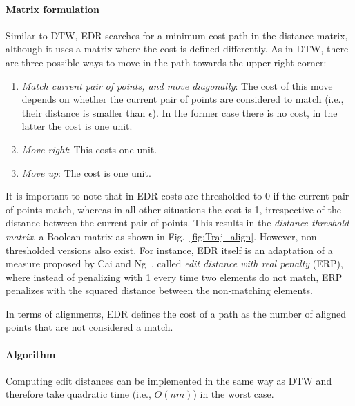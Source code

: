 \documentclass[10pt,letterpaper]{article}
\begin{document}
\paragraph{Matrix formulation}
Similar to DTW, EDR searches for a minimum cost path in the distance matrix, although it uses a matrix where the cost is defined differently. As in DTW, there are three possible ways to move in the path towards the upper right corner:

\begin{enumerate}
\item \textit{Match current pair of points, and move diagonally}: The cost of this move depends on whether the current pair of points are considered to match (i.e., their distance is smaller than $\epsilon$).
In the former case there is no cost, in the latter the cost is one unit.
\item  \textit{Move right}: This costs one unit.
\item  \textit{Move up}: The cost is one unit.
\end{enumerate}

It is important to note that in EDR costs are thresholded to 0 if the current pair of points match, whereas in all other situations the cost is 1, irrespective of the distance between the current pair of points. This results in the \emph{distance threshold matrix}, a Boolean matrix as shown in Fig.~\ref{fig:Traj_align}.
However, non-thresholded versions also exist.
For instance, EDR itself is an adaptation of a measure proposed by Cai and Ng~\cite{NgC04}, called \emph{edit distance with real penalty} (ERP), where instead of penalizing with 1 every time two elements do not match, ERP penalizes with the squared distance between the non-matching elements.


In terms of alignments, EDR defines the cost of a path as the number of aligned points that are not considered a match.

\paragraph{Algorithm}
Computing edit distances can be implemented in the same way as DTW and therefore take quadratic time (i.e., $O(nm)$) in the worst case.
\end{document}
